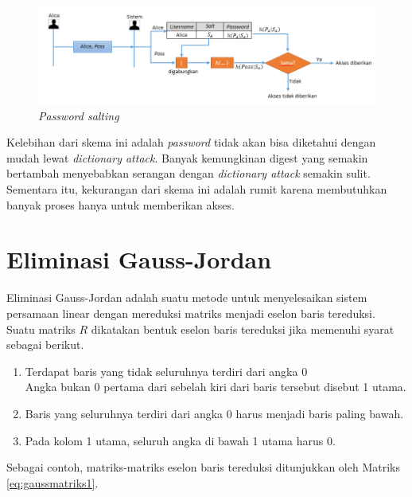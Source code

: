 \begin{figure}[H]
	\includegraphics[scale=0.7]{Gambar/password_3}
	\centering
	\caption{\textit{Password salting}}\label{fig:password3}
\end{figure}

Kelebihan dari skema ini adalah \textit{password} tidak akan bisa diketahui dengan mudah lewat \textit{dictionary attack}. Banyak kemungkinan digest yang semakin bertambah menyebabkan serangan dengan \textit{dictionary attack} semakin sulit. Sementara itu, kekurangan dari skema ini adalah rumit karena membutuhkan banyak proses hanya untuk memberikan akses.

\section{Eliminasi Gauss-Jordan}\label{sec:eliminasigaussjordan}

Eliminasi Gauss-Jordan adalah suatu metode untuk menyelesaikan sistem persamaan linear dengan mereduksi matriks menjadi eselon baris tereduksi\cite{norman2012introduction}. Suatu matriks \begin{math}R\end{math} dikatakan bentuk eselon baris tereduksi jika memenuhi syarat sebagai berikut\cite{norman2012introduction}.

\begin{enumerate}
	\item Terdapat baris yang tidak seluruhnya terdiri dari angka 0 \\
	Angka bukan 0 pertama dari sebelah kiri dari baris tersebut disebut 1 utama.
	\item Baris yang seluruhnya terdiri dari angka 0 harus menjadi baris paling bawah.
	\item Pada kolom 1 utama, seluruh angka di bawah 1 utama harus 0.
\end{enumerate}

Sebagai contoh, matriks-matriks eselon baris tereduksi ditunjukkan oleh Matriks \ref{eq:gaussmatriks1}.

